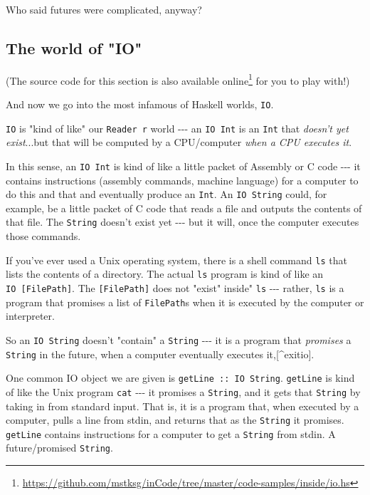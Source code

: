 \documentclass[]{article}
\renewcommand{\href}[2]{#2\footnote{\url{#1}}}
\begin{document}
Who said futures were complicated, anyway?

\subsection{The world of "IO"}

(The source code for this section is
\href{https://github.com/mstksg/inCode/tree/master/code-samples/inside/io.hs}{also
available online} for you to play with!)

And now we go into the most infamous of Haskell worlds, \texttt{IO}.

\texttt{IO} is "kind of like" our \texttt{Reader\ r} world -\/-\/- an
\texttt{IO\ Int} is an \texttt{Int} that \emph{doesn't yet exist}...but that
will be computed by a CPU/computer \emph{when a CPU executes it}.

In this sense, an \texttt{IO\ Int} is kind of like a little packet of Assembly
or C code -\/-\/- it contains instructions (assembly commands, machine language)
for a computer to do this and that and eventually produce an \texttt{Int}. An
\texttt{IO\ String} could, for example, be a little packet of C code that reads
a file and outputs the contents of that file. The \texttt{String} doesn't exist
yet -\/-\/- but it will, once the computer executes those commands.

If you've ever used a Unix operating system, there is a shell command
\texttt{ls} that lists the contents of a directory. The actual \texttt{ls}
program is kind of like an \texttt{IO\ {[}FilePath{]}}. The
\texttt{{[}FilePath{]}} does not "exist" inside" \texttt{ls} -\/-\/- rather,
\texttt{ls} is a program that promises a list of \texttt{FilePath}s when it is
executed by the computer or interpreter.

So an \texttt{IO\ String} doesn't "contain" a \texttt{String} -\/-\/- it is a
program that \emph{promises} a \texttt{String} in the future, when a computer
eventually executes it,{[}\^{}exitio{]}.

One common IO object we are given is \texttt{getLine\ ::\ IO\ String}.
\texttt{getLine} is kind of like the Unix program \texttt{cat} -\/-\/- it
promises a \texttt{String}, and it gets that \texttt{String} by taking in from
standard input. That is, it is a program that, when executed by a computer,
pulls a line from stdin, and returns that as the \texttt{String} it promises.
\texttt{getLine} contains instructions for a computer to get a \texttt{String}
from stdin. A future/promised \texttt{String}.
\end{document}
